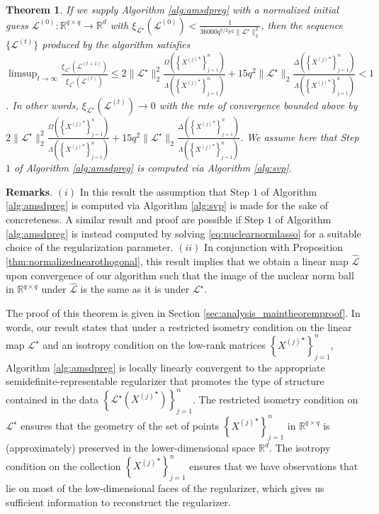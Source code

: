 \documentclass[11pt,letterpaper]{article}
\newtheorem{theorem}{Theorem}
\newcommand{\R}{\mathbb{R}}
\renewcommand{\L}{\mathcal{L}}
\begin{document}
\begin{theorem}
If we supply Algorithm \ref{alg:amsdpreg} with a normalized initial guess $\L^{(0)} : \R^{q \times q} \rightarrow \R^d$ with $\xi_{\L^\star}(\L^{(0)}) < \frac{1}{36000 q^{7/2} r^2 \|\L^\star\|_2^2}$, then the sequence $\{\L^{(t)}\}$ produced by the algorithm satisfies $\limsup_{t \rightarrow \infty} \frac{\xi_{\L^\star}(\L^{(t+1)})}{\xi_{\L^\star}(\L^{(t)})} \leq 2 \|\L^\star\|_2^2 \frac{\Omega\left(\left\{{X^{(j)}}^\star \right\}_{j=1}^n \right)}{\Lambda\left( \left\{{X^{(j)}}^\star \right\}_{j=1}^n \right)} + 15 q^2 \|\L^\star\|_2 \frac{\Delta\left(\left\{{X^{(j)}}^\star \right\}_{j=1}^n \right)}{\Lambda\left( \left\{{X^{(j)}}^\star \right\}_{j=1}^n \right)} < 1$.  In other words, $\xi_{\L^\star}(\L^{(t)}) \rightarrow 0$ with the rate of convergence bounded above by $2 \|\L^\star\|_2^2 \frac{\Omega\left(\left\{{X^{(j)}}^\star \right\}_{j=1}^n \right)}{\Lambda\left( \left\{{X^{(j)}}^\star \right\}_{j=1}^n \right)} + 15 q^2 \|\L^\star\|_2 \frac{\Delta\left(\left\{{X^{(j)}}^\star \right\}_{j=1}^n \right)}{\Lambda\left( \left\{{X^{(j)}}^\star \right\}_{j=1}^n \right)}$.  We assume here that Step $1$ of Algorithm \ref{alg:amsdpreg} is computed via Algorithm \ref{alg:svp}.
\end{theorem}

\textbf{Remarks}. $(i)$ In this result the assumption that Step $1$ of Algorithm \ref{alg:amsdpreg} is computed via Algorithm \ref{alg:svp} is made for the sake of concreteness.  A similar result and proof are possible if Step $1$ of Algorithm \ref{alg:amsdpreg} is instead computed by solving \eqref{eq:nuclearnormlasso} for a suitable choice of the regularization parameter. $(ii)$ In conjunction with Proposition \ref{thm:normalizednearothogonal}, this result implies that we obtain a linear map $\hat{\L}$ upon convergence of our algorithm such that the image of the nuclear norm ball in $\R^{q \times q}$ under $\hat{\L}$ is the same as it is under $\L^\star$.


The proof of this theorem is given in Section \ref{sec:analysis_maintheoremproof}.  In words, our result states that under a restricted isometry condition on the linear map $\L^\star$ and an isotropy condition on the low-rank matrices $\left\{{X^{(j)}}^\star \right\}_{j=1}^n$, Algorithm \ref{alg:amsdpreg} is locally linearly convergent to the appropriate semidefinite-representable regularizer that promotes the type of structure contained in the data $\left\{\L^\star\left({X^{(j)}}^\star\right) \right\}_{j=1}^n$.  The restricted isometry condition on $\L^\star$ ensures that the geometry of the set of points $\left\{{X^{(j)}}^\star \right\}_{j=1}^n$ in $\R^{q \times q}$ is (approximately) preserved in the lower-dimensional space $\R^d$.  The isotropy condition on the collection $\left\{{X^{(j)}}^\star \right\}_{j=1}^n$ ensures that we have observations that lie on most of the low-dimensional faces of the regularizer, which gives us sufficient information to reconstruct the regularizer.
\end{document}
